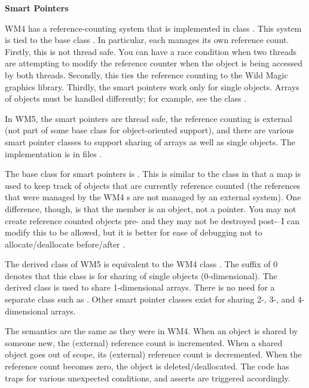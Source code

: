 \documentclass{article}
\begin{document}
\vspace*{0.1in}
{\bf Smart Pointers}

WM4 has a reference-counting system that is implemented in class .
This system is tied to the base class .  In particular, each 
manages its own reference count.  Firstly, this is not thread safe.  You can have a
race condition when two threads are attempting to modify the reference counter when
the object is being accessed by both threads.  Secondly, this ties the reference
counting to the Wild Magic graphics library.  Thirdly, the smart pointers work only
for single objects.  Arrays of objects must be handled differently; for example, see
the  class .

In WM5, the smart pointers are thread safe, the reference counting is external (not
part of some base class for object-oriented support), and there are various smart
pointer classes to support sharing of arrays as well as single objects.  The
implementation is in files .

The base class for smart pointers is .  This is similar to the
 class in that a map is used to keep track of objects that are
currently reference counted (the references that were managed by the WM4
s are not managed by an external system).  One difference, though,
is that the  member is an object, not a pointer.  You may not create
reference counted objects pre- and they may not be destroyed
post---I can modify this to be allowed, but it is better for
ease of debugging not to allocate/deallocate before/after .

The derived class  of WM5 is equivalent to the WM4 class .
The suffix of $0$ denotes that this class is for sharing of single objects (0-dimensional).
The derived class  is used to share 1-dimensional arrays.  There is no
need for a separate class such as .  Other smart pointer classes
exist for sharing 2-, 3-, and 4-dimensional arrays.

The semantics are the same as they were in WM4.  When an object is shared by someone new,
the (external) reference count is incremented.  When a shared object goes out of scope,
its (external) reference count is decremented.  When the reference count becomes zero,
the object is deleted/deallocated.  The code has traps for various unexpected conditions,
and asserts are triggered accordingly.
\end{document}
